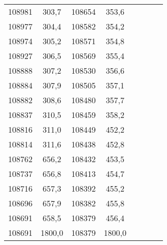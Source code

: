 \documentclass[11pt]{article}
\begin{document}
{{\begin{tabular}{|c|c|c|c|cccc}
            \cline{1-4} 
            108981 & 303,7 & 108654 & 353,6 &  &  &  & \tabularnewline
            \cline{1-4} 
            108977 & 304,4 & 108582 & 354,2 &  &  &  & \tabularnewline
            \cline{1-4} 
            108974 & 305,2 & 108571 & 354,8 &  &  &  & \tabularnewline
            \cline{1-4} 
            108927 & 306,5 & 108569 & 355,4 &  &  &  & \tabularnewline
            \cline{1-4} 
            108888 & 307,2 & 108530 & 356,6 &  &  &  & \tabularnewline
            \cline{1-4} 
            108884 & 307,9 & 108505 & 357,1 &  &  &  & \tabularnewline
            \cline{1-4} 
            108882 & 308,6 & 108480 & 357,7 &  &  &  & \tabularnewline
            \cline{1-4} 
            108837 & 310,5 & 108459 & 358,2 &  &  &  & \tabularnewline
            \cline{1-4} 
            108816 & 311,0 & 108449 & 452,2 &  &  &  & \tabularnewline
            \cline{1-4} 
            108814 & 311,6 & 108438 & 452,8 &  &  &  & \tabularnewline
            \cline{1-4} 
            108762 & 656,2 & 108432 & 453,5 &  &  &  & \tabularnewline
            \cline{1-4} 
            108737 & 656,8 & 108413 & 454,7 &  &  &  & \tabularnewline
            \cline{1-4} 
            108716 & 657,3 & 108392 & 455,2 &  &  &  & \tabularnewline
            \cline{1-4} 
            108696 & 657,9 & 108382 & 455,8 &  &  &  & \tabularnewline
            \cline{1-4} 
            108691 & 658,5 & 108379 & 456,4 &  &  &  & \tabularnewline
            \cline{1-4} 
            108691 & 1800,0 & 108379 & 1800,0 &  &  &  & \tabularnewline
            \cline{1-4} 
        \end{tabular}
    }
}
\vspace*{\fill}
\end{document}
